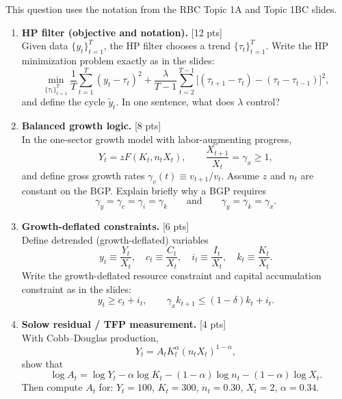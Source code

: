 \documentclass[12pt]{article}
\newcommand{\pts}[1]{\hfill{\small[#1 pts]}}
\begin{document}
This question uses the notation from the RBC Topic 1A and Topic 1BC slides.

\begin{enumerate}[label=(\alph*)]
\item \textbf{HP filter (objective and notation).} \pts{12}\\
Given data \(\{y_t\}_{t=1}^{T}\), the HP filter chooses a trend \(\{\tau_t\}_{t=1}^{T}\).
Write the HP minimization problem exactly as in the slides:
\[
\min_{\{\tau_t\}_{t=1}^{T}}
\frac{1}{T}\sum_{t=1}^{T}(y_t-\tau_t)^2
+\frac{\lambda}{T-1}\sum_{t=2}^{T-1}\Big[(\tau_{t+1}-\tau_t)-(\tau_t-\tau_{t-1})\Big]^2,
\]
and define the cycle \(\tilde y_t\).
In one sentence, what does \(\lambda\) control?

\item \textbf{Balanced growth logic.} \pts{8}\\
In the one-sector growth model with labor-augmenting progress,
\[
Y_t = z F(K_t, n_t X_t),\qquad \frac{X_{t+1}}{X_t}=\gamma_x\ge 1,
\]
and define gross growth rates \(\gamma_v(t)\equiv v_{t+1}/v_t\).
Assume \(z\) and \(n_t\) are constant on the BGP.
Explain briefly why a BGP requires
\[
\gamma_y=\gamma_c=\gamma_i=\gamma_k
\qquad\text{and}\qquad
\gamma_y=\gamma_k=\gamma_x.
\]

\item \textbf{Growth-deflated constraints.} \pts{6}\\
Define detrended (growth-deflated) variables
\[
y_t\equiv \frac{Y_t}{X_t},\quad c_t\equiv \frac{C_t}{X_t},\quad i_t\equiv \frac{I_t}{X_t},\quad k_t\equiv \frac{K_t}{X_t}.
\]
Write the growth-deflated resource constraint and capital accumulation constraint as in the slides:
\[
y_t \ge c_t+i_t,
\qquad
\gamma_x k_{t+1}\le (1-\delta)k_t+i_t.
\]

\item \textbf{Solow residual / TFP measurement.} \pts{4}\\
With Cobb--Douglas production,
\[
Y_t = A_t K_t^{\alpha}(n_t X_t)^{1-\alpha},
\]
show that
\[
\log A_t = \log Y_t - \alpha \log K_t - (1-\alpha)\log n_t - (1-\alpha)\log X_t.
\]
Then compute \(A_t\) for: \(Y_t=100\), \(K_t=300\), \(n_t=0.30\), \(X_t=2\), \(\alpha=0.34\).
\end{enumerate}
\end{document}
